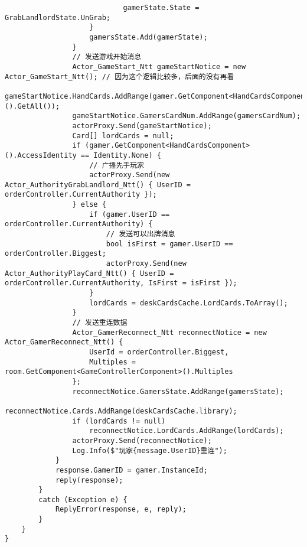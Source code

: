 \documentclass[9pt, b5paper]{article}
\begin{document}
\begin{itemize}
\begin{verbatim}
                            gamerState.State = GrabLandlordState.UnGrab;
                    }
                    gamersState.Add(gamerState);
                }
                // 发送游戏开始消息
                Actor_GameStart_Ntt gameStartNotice = new Actor_GameStart_Ntt(); // 因为这个逻辑比较多，后面的没有再看
                gameStartNotice.HandCards.AddRange(gamer.GetComponent<HandCardsComponent>().GetAll());
                gameStartNotice.GamersCardNum.AddRange(gamersCardNum);
                actorProxy.Send(gameStartNotice);
                Card[] lordCards = null;
                if (gamer.GetComponent<HandCardsComponent>().AccessIdentity == Identity.None) {
                    // 广播先手玩家
                    actorProxy.Send(new Actor_AuthorityGrabLandlord_Ntt() { UserID = orderController.CurrentAuthority });
                } else {
                    if (gamer.UserID == orderController.CurrentAuthority) {
                        // 发送可以出牌消息
                        bool isFirst = gamer.UserID == orderController.Biggest;
                        actorProxy.Send(new Actor_AuthorityPlayCard_Ntt() { UserID = orderController.CurrentAuthority, IsFirst = isFirst });
                    }
                    lordCards = deskCardsCache.LordCards.ToArray();
                }
                // 发送重连数据
                Actor_GamerReconnect_Ntt reconnectNotice = new Actor_GamerReconnect_Ntt() {
                    UserId = orderController.Biggest,
                    Multiples = room.GetComponent<GameControllerComponent>().Multiples
                };
                reconnectNotice.GamersState.AddRange(gamersState);
                reconnectNotice.Cards.AddRange(deskCardsCache.library);
                if (lordCards != null) 
                    reconnectNotice.LordCards.AddRange(lordCards);
                actorProxy.Send(reconnectNotice);
                Log.Info($"玩家{message.UserID}重连");
            }
            response.GamerID = gamer.InstanceId;
            reply(response);
        }
        catch (Exception e) {
            ReplyError(response, e, reply);
        }
    }
}
\end{verbatim}
\end{itemize}
\end{document}
